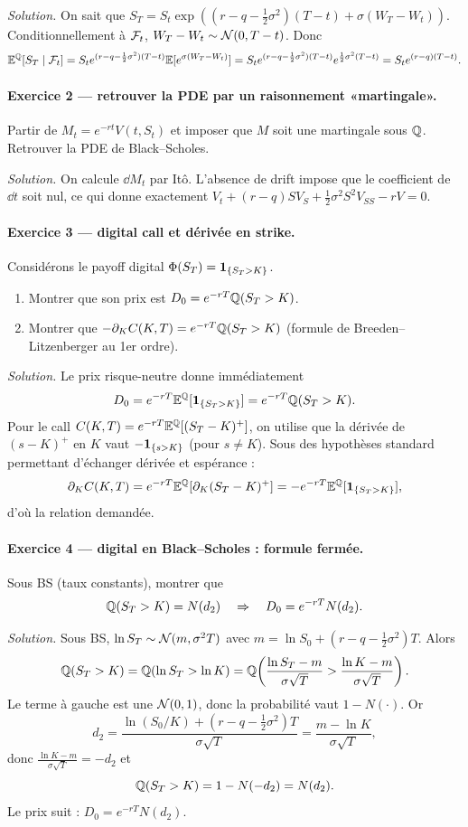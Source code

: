 \emph{Solution.}
On sait que $S_T=S_t\exp((r-q-\frac12\sigma^2)(T-t)+\sigma (W_T-W_t))$.
Conditionnellement à $\mathcal{F}_t$, $W_T-W_t\sim\mathcal{N}(0,T-t)$.
Donc
\[
\mathbb{E}^{\mathbb{Q}}[S_T\mid \mathcal{F}_t]=S_t e^{(r-q-\frac12\sigma^2)(T-t)}\mathbb{E}[e^{\sigma (W_T-W_t)}]
=S_t e^{(r-q-\frac12\sigma^2)(T-t)}e^{\frac12\sigma^2(T-t)}
=S_t e^{(r-q)(T-t)}.
\]

\paragraph{Exercice 2 --- retrouver la PDE par un raisonnement «martingale».}
Partir de $M_t=e^{-rt}V(t,S_t)$ et imposer que $M$ soit une martingale sous $\mathbb{Q}$.
Retrouver la PDE de Black--Scholes.

\emph{Solution.}
On calcule $\dd M_t$ par Itô. L'absence de drift impose que le coefficient de $\dd t$ soit nul, ce qui donne exactement
$V_t+(r-q)SV_S+\tfrac12\sigma^2S^2V_{SS}-rV=0$.

\paragraph{Exercice 3 --- digital call et dérivée en strike.}
Considérons le payoff digital $\Phi(S_T)=\mathbf{1}_{\{S_T>K\}}$.
\begin{enumerate}[leftmargin=*]
\item Montrer que son prix est $D_0=e^{-rT}\mathbb{Q}(S_T>K)$.
\item Montrer que $-\partial_K C(K,T)=e^{-rT}\mathbb{Q}(S_T>K)$ (formule de Breeden--Litzenberger au 1er ordre).
\end{enumerate}

\emph{Solution.}
Le prix risque-neutre donne immédiatement
\[
D_0=e^{-rT}\mathbb{E}^{\mathbb{Q}}[\mathbf{1}_{\{S_T>K\}}]=e^{-rT}\mathbb{Q}(S_T>K).
\]
Pour le call $C(K,T)=e^{-rT}\mathbb{E}^{\mathbb{Q}}[(S_T-K)^+]$, on utilise que la dérivée de $(s-K)^+$ en $K$ vaut $-\mathbf{1}_{\{s>K\}}$ (pour $s\neq K$).
Sous des hypothèses standard permettant d'échanger dérivée et espérance :
\[
\partial_K C(K,T)=e^{-rT}\mathbb{E}^{\mathbb{Q}}[\partial_K(S_T-K)^+]
=-e^{-rT}\mathbb{E}^{\mathbb{Q}}[\mathbf{1}_{\{S_T>K\}}],
\]
d'où la relation demandée.

\paragraph{Exercice 4 --- digital en Black--Scholes : formule fermée.}
Sous BS (taux constants), montrer que
\[
\mathbb{Q}(S_T>K)=N(d_2)
\quad\Rightarrow\quad
D_0=e^{-rT}N(d_2).
\]

\emph{Solution.}
Sous BS, $\ln S_T\sim \mathcal{N}(m,\sigma^2T)$ avec
$m=\ln S_0+(r-q-\tfrac12\sigma^2)T$.
Alors
\[
\mathbb{Q}(S_T>K)=\mathbb{Q}(\ln S_T>\ln K)
=\mathbb{Q}\!\left(\frac{\ln S_T-m}{\sigma\sqrt{T}}>\frac{\ln K-m}{\sigma\sqrt{T}}\right).
\]
Le terme à gauche est une $\mathcal{N}(0,1)$, donc la probabilité vaut $1-N(\cdot)$.
Or
\[
d_2=\frac{\ln(S_0/K)+(r-q-\tfrac12\sigma^2)T}{\sigma\sqrt{T}}=\frac{m-\ln K}{\sigma\sqrt{T}},
\]
donc $\frac{\ln K-m}{\sigma\sqrt{T}}=-d_2$ et
\[
\mathbb{Q}(S_T>K)=1-N(-d_2)=N(d_2).
\]
Le prix suit : $D_0=e^{-rT}N(d_2)$.

